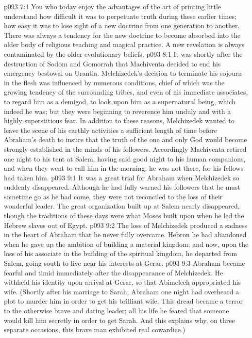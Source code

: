 \vs p093 7:4 \pc You who today enjoy the advantages of the art of printing little understand how difficult it was to perpetuate truth during these earlier times; how easy it was to lose sight of a new doctrine from one generation to another. There was always a tendency for the new doctrine to become absorbed into the older body of religious teaching and magical practice. A new revelation is always contaminated by the older evolutionary beliefs.
\vs p093 8:1 It was shortly after the destruction of Sodom and Gomorrah that Machiventa decided to end his emergency bestowal on Urantia. Melchizedek’s decision to terminate his sojourn in the flesh was influenced by numerous conditions, chief of which was the growing tendency of the surrounding tribes, and even of his immediate associates, to regard him as a demigod, to look upon him as a supernatural being, which indeed he was; but they were beginning to reverence him unduly and with a highly superstitious fear. In addition to these reasons, Melchizedek wanted to leave the scene of his earthly activities a sufficient length of time before Abraham’s death to insure that the truth of the one and only God would become strongly established in the minds of his followers. Accordingly Machiventa retired one night to his tent at Salem, having said good night to his human companions, and when they went to call him in the morning, he was not there, for his fellows had taken him.
\vs p093 9:1 It was a great trial for Abraham when Melchizedek so suddenly disappeared. Although he had fully warned his followers that he must sometime go as he had come, they were not reconciled to the loss of their wonderful leader. The great organization built up at Salem nearly disappeared, though the traditions of these days were what Moses built upon when he led the Hebrew slaves out of Egypt.
\vs p093 9:2 \pc The loss of Melchizedek produced a sadness in the heart of Abraham that he never fully overcame. Hebron he had abandoned when he gave up the ambition of building a material kingdom; and now, upon the loss of his associate in the building of the spiritual kingdom, he departed from Salem, going south to live near his interests at Gerar.
\vs p093 9:3 Abraham became fearful and timid immediately after the disappearance of Melchizedek. He withheld his identity upon arrival at Gerar, so that Abimelech appropriated his wife. (Shortly after his marriage to Sarah, Abraham one night had overheard a plot to murder him in order to get his brilliant wife. This dread became a terror to the otherwise brave and daring leader; all his life he feared that someone would kill him secretly in order to get Sarah. And this explains why, on three separate occasions, this brave man exhibited real cowardice.)
